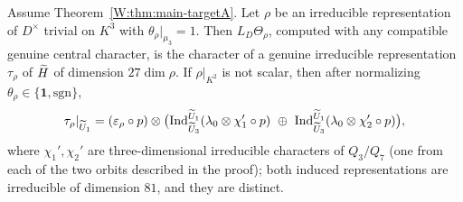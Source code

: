 \begin{theorem}\label{W:thm:leveltwo}
Assume Theorem~\ref{W:thm:main-targetA}.  Let $\rho$ be an irreducible
representation of $D^\times$ trivial on $K^3$ with $\theta_\rho|_{\mu_3}=1$.  Then $L_D\Theta_\rho$, computed
with any compatible genuine central character, is the character of a
genuine irreducible representation $\tau_\rho$ of $\widetilde H$ of dimension
$27\dim\rho$.  If $\rho|_{K^2}$ is not scalar, then after normalizing
$\theta_\rho\in\{\mathbf1,\mathrm{sgn}\}$,
\[
 \tau_\rho|_{\tU_1}=(\varepsilon_\rho\circ p)\otimes\bigl(\Ind_{\tU_3}^{\tU_1}(\lambda_0\otimes\chi_1'\circ p)\ \oplus\ \Ind_{\tU_3}^{\tU_1}(\lambda_0\otimes\chi_2'\circ p)\bigr),
\]
where $\chi_1',\chi_2'$ are three-dimensional irreducible characters of
$Q_3/Q_7$ (one from each of the two orbits described in the proof); both
induced representations are irreducible of dimension $81$, and they are
distinct.
\end{theorem}
